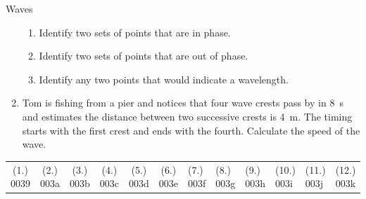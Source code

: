 \begin{exercises}{Waves}
\begin{enumerate}[noitemsep, label=\textbf{\arabic*}. ]
\begin{figure}[H]
 \end{figure}       \label{m38806*id321157}\begin{enumerate}[noitemsep, label=\textbf{\alph*}. ] 
            \label{m38806*uid55}\item Identify two sets of points that are in phase.
\label{m38806*uid56}\item Identify two sets of points that are out of phase.
\label{m38806*uid57}\item Identify any two points that would indicate a wavelength.
\end{enumerate}
                \label{m38806*uid58}\item Tom is fishing from a pier and notices that four wave crests pass by in 8~s and estimates the distance between two successive crests is 4~m. The timing starts with the first crest and ends with the fourth. Calculate the speed of the wave.\newline
\end{enumerate}
\par \practiceinfo
 \par \begin{tabular}[h]{cccccc}
 (1.) 0039  &  (2.) 003a  &  (3.) 003b  &  (4.) 003c  &  (5.) 003d  &  (6.) 003e  &  (7.) 003f  &  (8.) 003g  &  (9.) 003h  &  (10.) 003i  &  (11.) 003j  &  (12.) 003k  & \end{tabular}

\end{exercises}    

